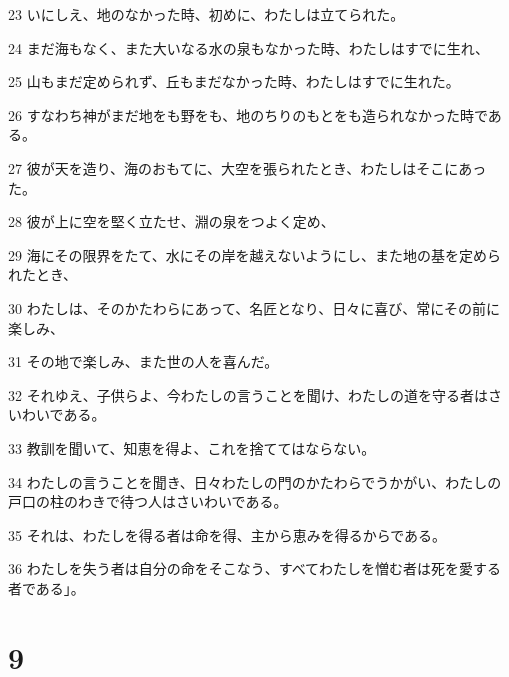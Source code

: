 \par 23 いにしえ、地のなかった時、初めに、わたしは立てられた。
\par 24 まだ海もなく、また大いなる水の泉もなかった時、わたしはすでに生れ、
\par 25 山もまだ定められず、丘もまだなかった時、わたしはすでに生れた。
\par 26 すなわち神がまだ地をも野をも、地のちりのもとをも造られなかった時である。
\par 27 彼が天を造り、海のおもてに、大空を張られたとき、わたしはそこにあった。
\par 28 彼が上に空を堅く立たせ、淵の泉をつよく定め、
\par 29 海にその限界をたて、水にその岸を越えないようにし、また地の基を定められたとき、
\par 30 わたしは、そのかたわらにあって、名匠となり、日々に喜び、常にその前に楽しみ、
\par 31 その地で楽しみ、また世の人を喜んだ。
\par 32 それゆえ、子供らよ、今わたしの言うことを聞け、わたしの道を守る者はさいわいである。
\par 33 教訓を聞いて、知恵を得よ、これを捨ててはならない。
\par 34 わたしの言うことを聞き、日々わたしの門のかたわらでうかがい、わたしの戸口の柱のわきで待つ人はさいわいである。
\par 35 それは、わたしを得る者は命を得、主から恵みを得るからである。
\par 36 わたしを失う者は自分の命をそこなう、すべてわたしを憎む者は死を愛する者である」。

\chapter{9}

